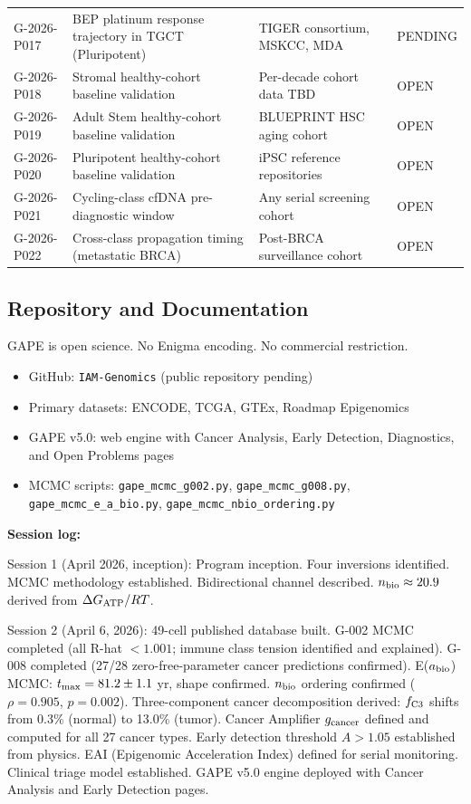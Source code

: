 \documentclass[12pt,a4paper]{article}
\begin{document}
\begin{center}
\begin{tabular}{p{1.4cm}p{4.2cm}p{4.8cm}p{2.5cm}}
G-2026-P017 & BEP platinum response trajectory in TGCT (Pluripotent) & TIGER consortium, MSKCC, MDA & PENDING \\
G-2026-P018 & Stromal healthy-cohort baseline validation & Per-decade cohort data TBD & OPEN \\
G-2026-P019 & Adult Stem healthy-cohort baseline validation & BLUEPRINT HSC aging cohort & OPEN \\
G-2026-P020 & Pluripotent healthy-cohort baseline validation & iPSC reference repositories & OPEN \\
G-2026-P021 & Cycling-class cfDNA pre-diagnostic window & Any serial screening cohort & OPEN \\
G-2026-P022 & Cross-class propagation timing (metastatic BRCA) & Post-BRCA surveillance cohort & OPEN \\
\bottomrule
\end{tabular}
\end{center}

\subsection{Repository and Documentation}

GAPE is open science. No Enigma encoding. No commercial restriction.
\begin{itemize}
\item GitHub: \texttt{IAM-Genomics} (public repository pending)
\item Primary datasets: ENCODE, TCGA, GTEx, Roadmap Epigenomics
\item GAPE v5.0: web engine with Cancer Analysis, Early Detection,
  Diagnostics, and Open Problems pages
\item MCMC scripts: \texttt{gape\_mcmc\_g002.py},
  \texttt{gape\_mcmc\_g008.py}, \texttt{gape\_mcmc\_e\_a\_bio.py},
  \texttt{gape\_mcmc\_nbio\_ordering.py}
\end{itemize}

\noindent \textbf{Session log:}

Session 1 (April 2026, inception): Program inception. Four inversions identified.
MCMC methodology established. Bidirectional channel described.
$n_{\rm bio} \approx 20.9$ derived from $\Delta G_{\rm ATP}/RT$.

Session 2 (April 6, 2026): 49-cell published database built.
G-002 MCMC completed (all R-hat $< 1.001$; immune class tension identified and explained).
G-008 completed (27/28 zero-free-parameter cancer predictions confirmed).
E($a_{\rm bio}$) MCMC: $t_{\rm max} = 81.2 \pm 1.1$ yr, shape confirmed.
$n_{\rm bio}$ ordering confirmed ($\rho = 0.905$, $p = 0.002$).
Three-component cancer decomposition derived: $f_{\rm C3}$ shifts from 0.3\%
(normal) to 13.0\% (tumor).
Cancer Amplifier $g_{\rm cancer}$ defined and computed for all 27 cancer types.
Early detection threshold $A > 1.05$ established from physics.
EAI (Epigenomic Acceleration Index) defined for serial monitoring.
Clinical triage model established.
GAPE v5.0 engine deployed with Cancer Analysis and Early Detection pages.
\end{document}
